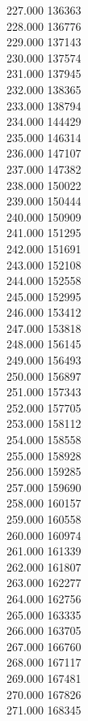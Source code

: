 { 227.000	136363 \\
 228.000	136776 \\
 229.000	137143 \\
 230.000	137574 \\
 231.000	137945 \\
 232.000	138365 \\
 233.000	138794 \\
 234.000	144429 \\
 235.000	146314 \\
 236.000	147107 \\
 237.000	147382 \\
 238.000	150022 \\
 239.000	150444 \\
 240.000	150909 \\
 241.000	151295 \\
 242.000	151691 \\
 243.000	152108 \\
 244.000	152558 \\
 245.000	152995 \\
 246.000	153412 \\
 247.000	153818 \\
 248.000	156145 \\
 249.000	156493 \\
 250.000	156897 \\
 251.000	157343 \\
 252.000	157705 \\
 253.000	158112 \\
 254.000	158558 \\
 255.000	158928 \\
 256.000	159285 \\
 257.000	159690 \\
 258.000	160157 \\
 259.000	160558 \\
 260.000	160974 \\
 261.000	161339 \\
 262.000	161807 \\
 263.000	162277 \\
 264.000	162756 \\
 265.000	163335 \\
 266.000	163705 \\
 267.000	166760 \\
 268.000	167117 \\
 269.000	167481 \\
 270.000	167826 \\
 271.000	168345 \\
}
